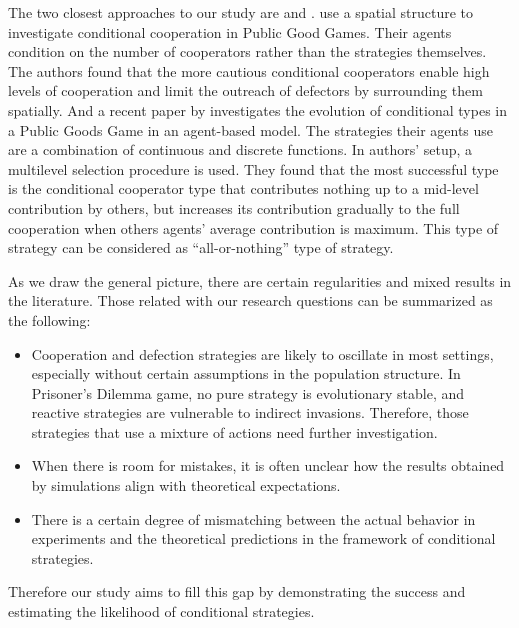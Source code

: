 \documentclass[12pt]{article}
\begin{document}
The two closest approaches to our study are \citet{Szolnoki2012-zq} and \citet{Zhang2016-pz}. \citet{Szolnoki2012-zq} use a spatial structure to investigate conditional cooperation in Public Good Games. Their agents condition on the number of cooperators rather than the strategies themselves. The authors found that the more cautious conditional cooperators enable high levels of cooperation and limit the outreach of defectors by surrounding them spatially. And a recent paper by \citet{Zhang2016-pz} investigates the evolution of conditional types in a Public Goods Game in an agent-based model. The strategies their agents use are a combination of continuous and discrete functions. In authors' setup, a multilevel selection procedure is used. They found that the most successful type is the conditional cooperator type that contributes nothing up to a mid-level contribution by others, but increases its contribution gradually to the full cooperation when others agents' average contribution is maximum. This type of strategy can be considered as ``all-or-nothing'' type of strategy. 

As we draw the general picture, there are certain regularities and mixed results in the literature. Those related with our research questions can be summarized as the following:

\begin{itemize}
    \item Cooperation and defection strategies are likely to oscillate in most settings, especially without certain assumptions in the population structure. In Prisoner's Dilemma game, no pure strategy is evolutionary stable, and reactive strategies are vulnerable to indirect invasions.\citep{Van_Veelen2012-ch, Van_Veelen2012-xf} Therefore, those strategies that use a mixture of actions need further investigation.

\item When there is room for mistakes, it is often unclear how the results obtained by simulations align with theoretical expectations.

\item There is a certain degree of mismatching between the actual behavior in experiments and the theoretical predictions in the framework of conditional strategies.
 
\end{itemize}

Therefore our study aims to fill this gap by demonstrating the success and estimating the likelihood of conditional strategies.
\end{document}
